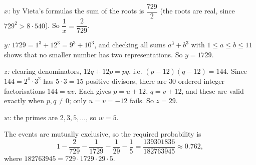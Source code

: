 \emph{$x$:} by Vieta's formulas the sum of the roots is $\dfrac{729}{2}$ (the roots are real, since $729^2>8\cdot540$). So $\dfrac1x=\dfrac{2}{729}$.

\emph{$y$:} $1729=1^3+12^3=9^3+10^3$, and checking all sums $a^3+b^3$ with $1\le a\le b\le11$ shows that no smaller number has two representations. So $y=1729$.

\emph{$z$:} clearing denominators, $12q+12p=pq$, i.e. $(p-12)(q-12)=144$. Since $144=2^4\cdot3^2$ has $5\cdot3=15$ positive divisors, there are $30$ ordered integer factorisations $144=uv$. Each gives $p=u+12$, $q=v+12$, and these are valid exactly when $p,q\ne0$; only $u=v=-12$ fails. So $z=29$.

\emph{$w$:} the primes are $2,3,5,\dots$, so $w=5$.

The events are mutually exclusive, so the required probability is
\[1-\dfrac2{729}-\dfrac1{1729}-\dfrac1{29}-\dfrac15=\boxed{\dfrac{139301836}{182763945}}\approx0.762,\]
where $182763945=729\cdot1729\cdot29\cdot5$.
